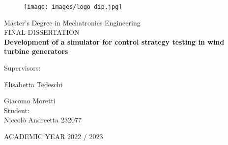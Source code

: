 \begin{figure}[H]
    \texttt{[image: images/logo\_dip.jpg]}
\end{figure}
\vspace{1.75cm}
\begin{center}
\huge
    Master's Degree in Mechatronics Engineering\\ 
    \vspace{0.5 cm}
    FINAL DISSERTATION\\ 
    \vspace{1 cm}
    \textbf{Development of a simulator for control strategy testing in wind turbine generators}

\vspace{1.5 cm}

\end{center}
{\LARGE
Supervisors: 

Elisabetta Tedeschi  

Giacomo Moretti\\

\vspace{0.5 cm}
Student:\\
Niccolò Andreetta 232077 \\ 

\vspace{3 cm}

\begin{center}
	ACADEMIC YEAR 2022 / 2023
\end{center}
\thispagestyle{empty}
\newpage
}
